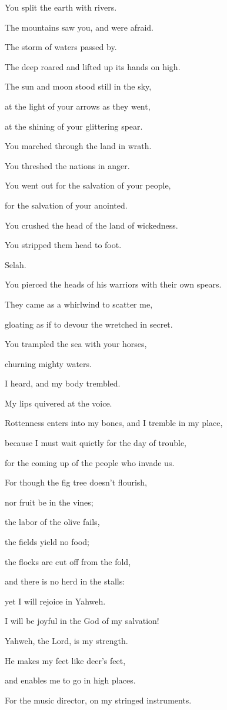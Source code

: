 {\Q You split the earth with rivers.
\par }{\Q {}The mountains saw you, and were afraid.
\par }{\QB The storm of waters passed by.
\par }{\QB The deep roared and lifted up its hands on high.
\par }{\Q {}The sun and moon stood still in the sky,
\par }{\QB at the light of your arrows as they went,
\par }{\QB at the shining of your glittering spear.
\par }{\Q {}You marched through the land in wrath.
\par }{\QB You threshed the nations in anger.
\par }{\Q {}You went out for the salvation of your people,
\par }{\QB for the salvation of your anointed.
\par }{\Q You crushed the head of the land of wickedness.
\par }{\QB You stripped them head to foot.
\par }{\QS Selah.\par }
{\BB \par }{\Q {}You pierced the heads of his warriors with their own spears.
\par }{\QB They came as a whirlwind to scatter me,
\par }{\QB gloating as if to devour the wretched in secret.
\par }{\Q {}You trampled the sea with your horses,
\par }{\QB churning mighty waters.
\par }{\Q {}I heard, and my body trembled.
\par }{\QB My lips quivered at the voice.
\par }{\Q Rottenness enters into my bones, and I tremble in my place,
\par }{\QB because I must wait quietly for the day of trouble,
\par }{\QB for the coming up of the people who invade us.
\par }{\Q {}For though the fig tree doesn’t flourish,
\par }{\QB nor fruit be in the vines;
\par }{\QB the labor of the olive fails,
\par }{\QB the fields yield no food;
\par }{\QB the flocks are cut off from the fold,
\par }{\QB and there is no herd in the stalls:
\par }{\Q {}yet I will rejoice in Yahweh.
\par }{\QB I will be joyful in the God of my salvation!
\par }{\Q {}Yahweh, the Lord, is my strength.
\par }{\QB He makes my feet like deer’s feet,
\par }{\QB and enables me to go in high places.
\par }{\PP For the music director, on my stringed instruments.
\par }